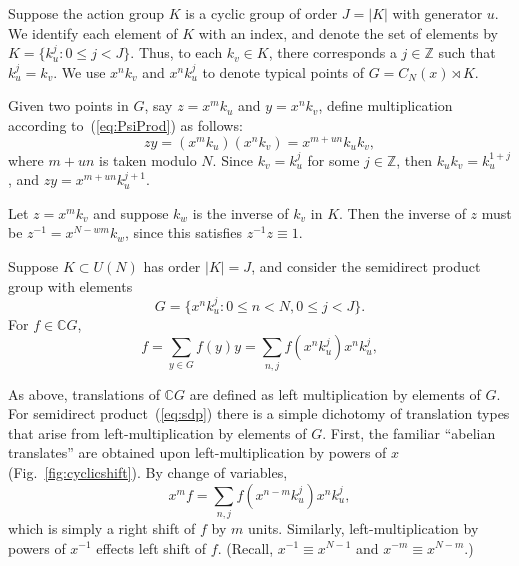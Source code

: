 \documentclass[reqno,onecolumn,oneside]{paper}
\newcommand{\<}{\ensuremath{\langle}}
\renewcommand{\>}{\ensuremath{\rangle}}
\newcommand{\sdp}{\ensuremath{\rtimes}}
\newcommand{\inverse}[1]{\ensuremath{#1^{-1}}}
\newcommand{\field}[1]{\ensuremath{\mathbb{#1}}}
\newcommand{\Z}{\field{Z}}                   %
\newcommand{\C}{\field{C}}                   %
\newcommand{\ga}[1]{\ensuremath{\C #1}} %
\newcommand{\CG}{\ga{G}}                %
\begin{document}
Suppose the action group $K$ is a cyclic group of order $J = |K|$ with generator
$u$. We identify each element of $K$ with an index, and denote 
the set of elements by $K = \{k_u^j: 0\leq j < J\}$.
Thus, to each $k_v \in K$, there corresponds a $j\in \Z$ 
such that $k_u^j=k_v$.
We use $x^n k_v$ and $x^n k_u^j$ to denote  
typical points of $G=C_N(x)\sdp K$.

Given two points in $G$, say $z = x^m k_u$
and $y=x^n k_v$, define multiplication %
according
to~(\ref{eq:PsiProd}) as follows:
\begin{equation}\label{eq:prod}
  zy = (x^m k_u)(x^n k_v) = x^{m+u n} k_u k_v,
\end{equation}
where %
$m+ u n$ is taken modulo $N$.
Since $k_v=k_u^j$ for some $j\in \Z$, then 
$k_u k_v = k_u^{1+j}$, and $zy = x^{m+u n} k_u^{j+1}$.

Let $z = x^m k_v$ and suppose $k_w$ is the inverse 
of $k_v$ in $K$.  Then the inverse of $z$ must be
$z^{-1}=x^{N-wm} k_w$, since this satisfies
$\inverse{z}z \equiv 1$.

Suppose $K \subset U(N)$ has order $|K|=J$, 
and consider the semidirect product group
with elements
\begin{equation}
  G   = \{x^n k_u^j : 0 \leq n < N, 0 \leq j < J\}.\label{eq:sdp}
\end{equation}
For $f\in \CG$, %
\begin{equation}
  f = \sum_{y\in G} f(y)y= \sum_{n,j} f(x^n k_u^j)x^n k_u^j,
\end{equation}

As above, translations of $\CG$ are defined as
left multiplication by elements of $G$.  
For semidirect product~(\ref{eq:sdp}) 
there is a simple dichotomy of translation types that arise
from left-multiplication by elements of $G$.  %
First, the familiar ``abelian translates'' 
are obtained upon left-multiplication by powers of $x$
(Fig.~\ref{fig:cyclicshift}).  
By change of variables, 
\begin{equation}\label{eq:001}
x^mf = \sum_{n,j} f(x^{n-m} k_u^j)x^n k_u^j,
\end{equation}
which is simply a right shift of $f$ by $m$ units.
Similarly, left-multiplication by powers of
$x^{-1}$ effects left shift of $f$. 
(Recall, $x^{-1} \equiv x^{N-1}$
and $x^{-m} \equiv x^{N-m}$.)  
\end{document}
